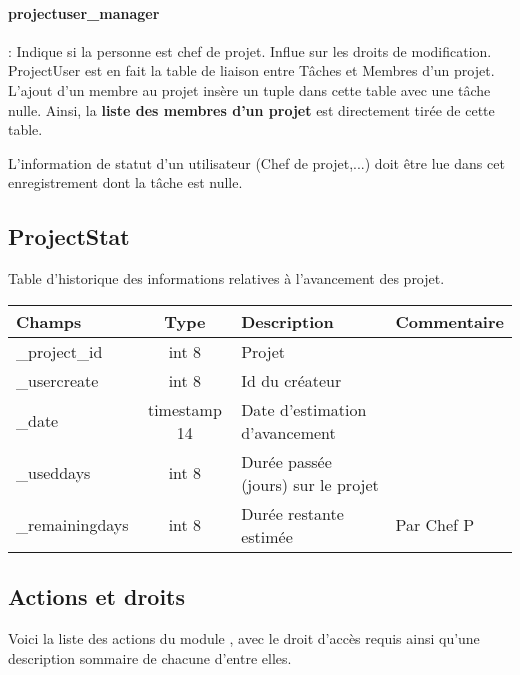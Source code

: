 \paragraph{projectuser\_manager} : Indique si la personne est chef de projet. Influe sur les droits de modification.\\


ProjectUser est en fait la table de liaison entre Tâches et Membres d'un projet.
L'ajout d'un membre au projet insère un tuple dans cette table avec une tâche nulle. Ainsi, la \textbf{liste des membres d'un projet} est directement tirée de cette table.

L'information de statut d'un utilisateur (Chef de projet,...) doit être lue dans cet enregistrement dont la tâche est nulle.

\subsection{ProjectStat}
Table d'historique des informations relatives à l'avancement des projet.\\

\begin{tabular}{|p{3cm}|c|p{5.4cm}|p{2.6cm}|}
\hline
\textbf{Champs} & \textbf{Type} & \textbf{Description} & \textbf{Commentaire} \\
\hline
\_project\_id & int 8 & Projet & \\
\hline
\_usercreate & int 8 & Id du créateur & \\
\hline
\_date & timestamp 14 & Date d'estimation d'avancement & \\
\hline
\_useddays & int 8 & Durée passée (jours) sur le projet & \\
\hline
\_remainingdays & int 8 & Durée restante estimée & Par Chef P \\
\hline
\end{tabular}


\subsection{Actions et droits}

Voici la liste des actions du module \project, avec le droit d'accès requis ainsi qu'une description sommaire de chacune d'entre elles.\\

